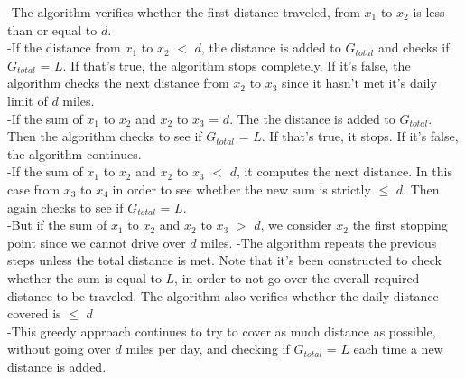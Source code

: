 \documentclass{article}
\begin{document}
\begin{addmargin}[1em]{2em}%
-The algorithm verifies whether the first distance traveled, from \(x_1\) to \(x_2\) is less than or equal to \(d\).\\
-If the distance from \(x_1\) to \(x_2\) $<$ \(d\), the distance is added to \(G_{total}\) and checks if \(G_{total}\) = \(L\). If that's true, the algorithm stops completely. If it's false, the algorithm checks the next distance from \(x_2\) to \(x_3\) since it hasn't met it's daily limit of \(d\) miles.\\
-If the sum of \(x_1\) to \(x_2\) and \(x_2\) to \(x_3\) = \(d\). The the distance is added to \(G_{total}\). Then the algorithm checks to see if \(G_{total}\) = \(L\). If that's true, it stops. If it's false, the algorithm continues.\\
-If the sum of \(x_1\) to \(x_2\) and \(x_2\) to \(x_3\) $<$ \(d\), it computes the next distance. In this case from \(x_3\) to \(x_4\) in order to see whether the new sum is strictly $\leq$ \(d\). Then again checks to see if \(G_{total}\) = \(L\). \\
-But if the sum of \(x_1\) to \(x_2\) and \(x_2\) to \(x_3\) $>$ \(d\), we consider \(x_2\) the first stopping point since we cannot drive over \(d\) miles.
-The algorithm repeats the previous steps unless the total distance is met. Note that it's been constructed to check whether the sum is equal to \(L\), in order to not go over the overall required distance to be traveled. The algorithm also verifies whether the daily distance covered is $\leq$ \(d\)\\
-This greedy approach continues to try to cover as much distance as possible, without going over \(d\) miles per day, and checking if \(G_{total}\) = \(L\) each time a new distance is added.\\
\end{addmargin}
\end{document}
